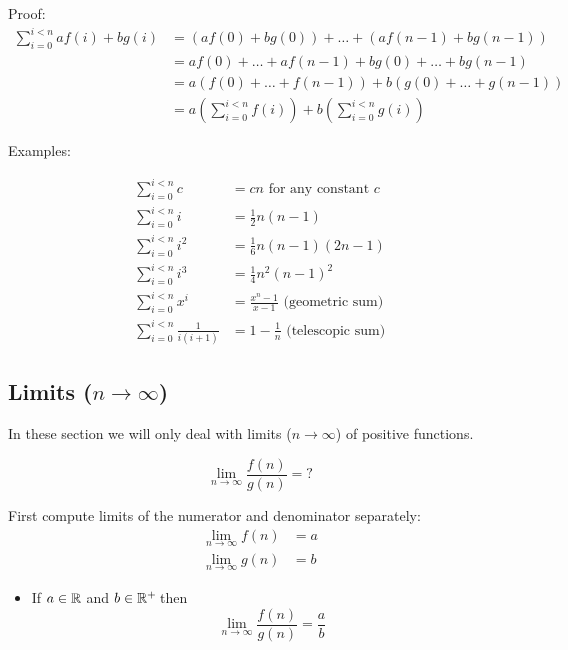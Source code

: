 \documentclass[justified,sixbynine]{tufte-book}
\theoremstyle{plain}%
\theoremstyle{definition}
\theoremstyle{remark}
\begin{document}
\begin{fullwidth}
Proof:
\begin{align}
\sum_{i=0}^{i<n}af(i)+bg(i) &= \left( af(0)+bg(0)\right) +\dots+\left(
af(n-1)+bg(n-1)\right)  \nonumber \\
&= af(0)+\dots+af(n-1)+bg(0)+\dots+bg(n-1)  \nonumber \\
&= a\left( f(0)+\dots+f(n-1)\right) +b\left( g(0)+\dots+g(n-1)\right)  \nonumber
\\
&= a\left( \sum_{i=0}^{i<n}f(i)\right) +b\left( \sum_{i=0}^{i<n}g(i)\right)
\end{align}

Examples:

\begin{align}
\sum_{i=0}^{i<n}c &= cn\text{ for any constant }c \\
\sum_{i=0}^{i<n}i &= \frac 12n(n-1) \\
\sum_{i=0}^{i<n}i^2 &= \frac 16n(n-1)(2n-1) \\
\sum_{i=0}^{i<n}i^3 &= \frac 14n^2(n-1)^2 \\
\sum_{i=0}^{i<n}x^i &= \frac{x^n-1}{x-1}\text{ (geometric sum)} \\
\sum_{i=0}^{i<n}\frac 1{i(i+1)} &= 1-\frac 1n\text{ (telescopic sum)}
\end{align}


\goodbreak\subsection{Limits ($n\rightarrow \infty $)}

In these section we will only deal with limits ($n\rightarrow \infty $) of
positive functions.

\begin{equation}
\lim_{n\rightarrow \infty }\frac{f(n)}{g(n)}=?
\end{equation}

First compute limits of the numerator and denominator separately:
\begin{align}
\lim_{n\rightarrow \infty }f(n) &= a \\
\lim_{n\rightarrow \infty }g(n) &= b
\end{align}

\begin{itemize}
\item  If $a\in {\Bbb R}$ and $b\in {\Bbb R}^{+}\,$then
\begin{equation}
\lim_{n\rightarrow \infty }\frac{f(n)}{g(n)}=\frac ab
\end{equation}


\end{itemize}
\end{fullwidth}
\end{document}
